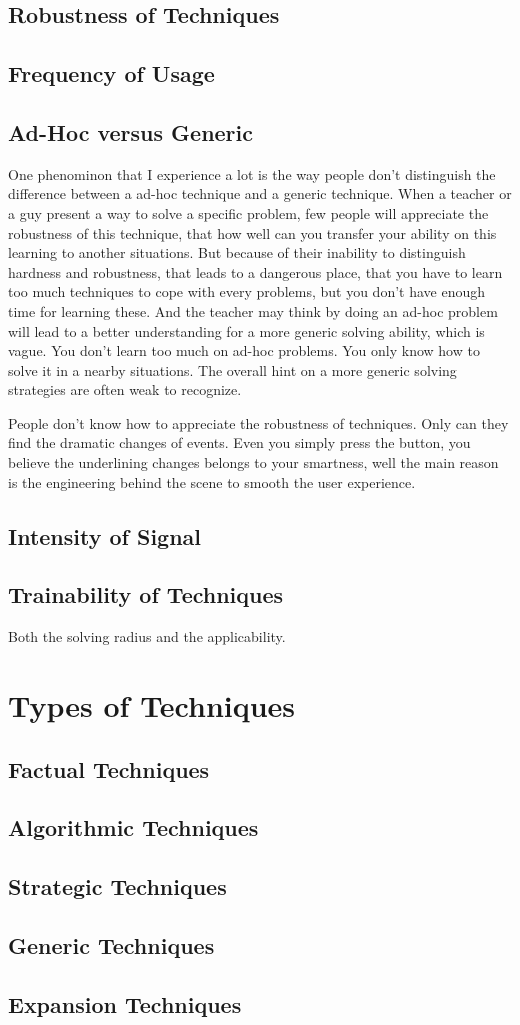 \subsection{Robustness of Techniques}
\subsection{Frequency of Usage}
\subsection{Ad-Hoc versus Generic}
One phenominon that I experience a lot is the way people don't distinguish the difference between a ad-hoc technique and a generic technique. When a teacher or a guy present a way to solve a specific problem, few people will appreciate the robustness of this technique, that how well can you transfer your ability on this learning to another situations. But because of their inability to distinguish hardness and robustness, that leads to a dangerous place, that you have to learn too much techniques to cope with every problems, but you don't have enough time for learning these. And the teacher may think by doing an ad-hoc problem will lead to a better understanding for a more generic solving ability, which is vague. You don't learn too much on ad-hoc problems. You only know how to solve it in a nearby situations. The overall hint on a more generic solving strategies are often weak to recognize.

People don't know how to appreciate the robustness of techniques. Only can they find the dramatic changes of events. Even you simply press the button, you believe the underlining changes belongs to your smartness, well the main reason is the engineering behind the scene to smooth the user experience.
\subsection{Intensity of Signal}
\subsection{Trainability of Techniques}
Both the solving radius and the applicability.

\section{Types of Techniques}
\subsection{Factual Techniques}
\subsection{Algorithmic Techniques}
\subsection{Strategic Techniques}
\subsection{Generic Techniques}
\subsection{Expansion Techniques}
